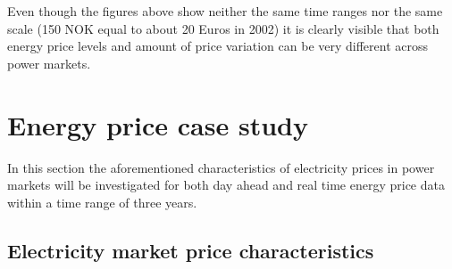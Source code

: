 Even though the figures above show neither the same time ranges nor the same scale (150 NOK equal to about 20 Euros in 2002) it is clearly visible that both energy price levels and amount of price variation can be very different across power markets. 




%
%
%
%


\section{Energy price case study}

In this section the aforementioned characteristics of electricity prices in power markets will be investigated for both day ahead and real time energy price data within a time range of three years. 


\subsection{Electricity market price characteristics}

